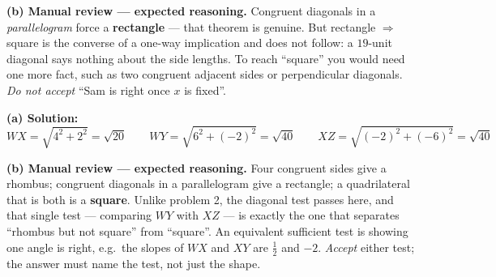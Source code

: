 \documentclass[12pt]{article}
\begin{document}
\textbf{(b) Manual review --- expected reasoning.} Congruent diagonals in a \emph{parallelogram}
force a \textbf{rectangle} --- that theorem is genuine. But rectangle $\Rightarrow$ square is the
converse of a one-way implication and does not follow: a $19$-unit diagonal says nothing about the
side lengths. To reach ``square'' you would need one more fact, such as two congruent adjacent
sides or perpendicular diagonals. \emph{Do not accept} ``Sam is right once $x$ is fixed''.

\textbf{(a) Solution:}
\[ WX = \sqrt{4^2 + 2^2} = \sqrt{20} \qquad
   WY = \sqrt{6^2 + (-2)^2} = \sqrt{40} \qquad
   XZ = \sqrt{(-2)^2 + (-6)^2} = \sqrt{40} \]
 \qquad {} \qquad {}

\textbf{(b) Manual review --- expected reasoning.} Four congruent sides give a rhombus; congruent
diagonals in a parallelogram give a rectangle; a quadrilateral that is both is a
\textbf{square}. Unlike problem 2, the diagonal test passes here, and that single test --- comparing
$WY$ with $XZ$ --- is exactly the one that separates ``rhombus but not square'' from ``square''.
An equivalent sufficient test is showing one angle is right, e.g.\ the slopes of $WX$ and $XY$ are
$\tfrac{1}{2}$ and $-2$. \emph{Accept} either test; the answer must name the test, not just the
shape.
\end{document}

